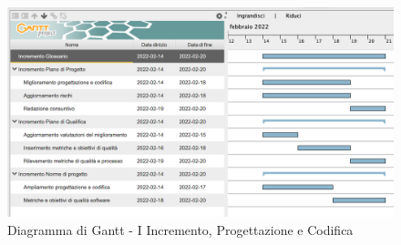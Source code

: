 \begin{figure}[H]
	\centering
	\includegraphics[scale=0.45]{Sezioni/gantt/I_incremento.png}
	\caption{Diagramma di Gantt - I Incremento, Progettazione e Codifica}
\end{figure}

\pagebreak

